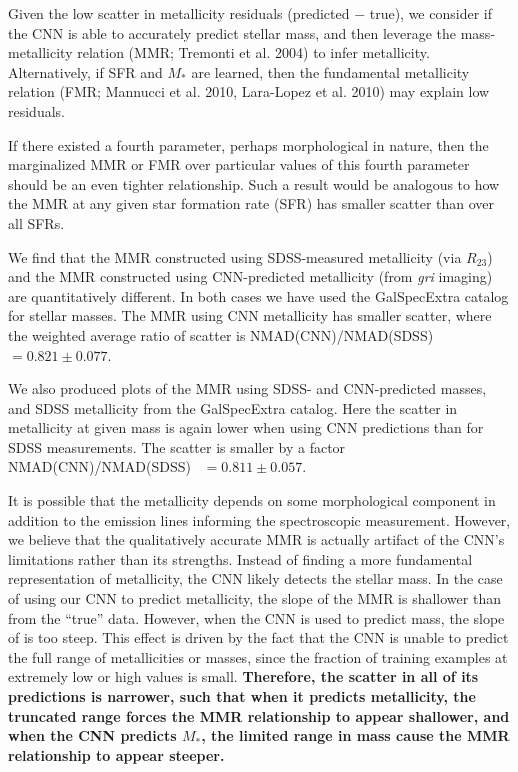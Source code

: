 \documentclass[fleqn,usenatbib]{mnras}
\begin{document}
Given the low scatter in metallicity residuals (predicted $-$ true), we consider if the CNN is able to accurately predict stellar mass, and then leverage the mass-metallicity relation (MMR; Tremonti et al. 2004) to infer metallicity.
Alternatively, if SFR and $M_*$ are learned, then the fundamental metallicity relation (FMR; Mannucci et al. 2010, Lara-Lopez et al. 2010) may explain low residuals.

If there existed a fourth parameter, perhaps morphological in nature, then the marginalized MMR or FMR over particular values of this fourth parameter should be an even tighter relationship.
Such a result would be analogous to how the MMR at any given star formation rate (SFR) has smaller scatter than over all SFRs.

We find that the MMR constructed using SDSS-measured metallicity (via $R_{23}$) and the MMR constructed using CNN-predicted metallicity (from \textit{gri} imaging) are quantitatively different.
In both cases we have used the GalSpecExtra catalog for stellar masses.
The MMR using CNN metallicity has smaller scatter, where the weighted average ratio of scatter is NMAD(CNN)/NMAD(SDSS)~$= 0.821 \pm 0.077$.


We also produced plots of the MMR using SDSS- and CNN-predicted masses, and SDSS metallicity from the GalSpecExtra catalog.
Here the scatter in metallicity at given mass is again lower when using CNN predictions than for SDSS measurements.
The scatter is smaller by a factor NMAD(CNN)/NMAD(SDSS)~ $= 0.811 \pm 0.057$.

It is possible that the metallicity depends on some morphological component in addition to the emission lines informing the spectroscopic measurement.
However, we believe that the qualitatively accurate MMR is actually artifact of the CNN's limitations rather than its strengths.
Instead of finding a more fundamental representation of metallicity, the CNN likely detects the stellar mass.
In the case of using our CNN to predict metallicity, the slope of the MMR is shallower than from the ``true'' data. 
However, when the CNN is used to predict mass, the slope of is too steep.
This effect is driven by the fact that the CNN is unable to predict the full range of metallicities or masses, since the fraction of training examples at extremely low or high values is small.
\textbf{Therefore, the scatter in all of its predictions is narrower, such that when it predicts metallicity, the truncated range forces the MMR relationship to appear shallower, and when the CNN predicts $M_*$, the limited range in mass cause the MMR relationship to appear steeper.}
\end{document}
